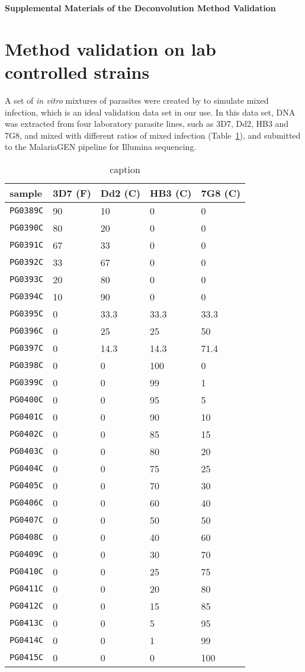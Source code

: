 

\begin{center}
\textbf{\large Supplemental Materials of the Deconvolution Method Validation}
\end{center}

\section{Method validation on lab controlled strains} \label{sup:sec:validate}
A set of {\it in vitro} mixtures of parasites were created by \citet{Wendler2015:sup} to simulate mixed infection, which is an ideal validation data set in our use. In this data set, DNA was extracted from four laboratory parasite lines, such as 3D7, Dd2, HB3 and 7G8, and mixed with different ratios of mixed infection (Table~\ref{tab:jason}), and submitted to the MalariaGEN \citep{MalariaGen2008:sup} pipeline for Illumina sequencing.

\begin{table}[ht]\centering
\begin{tabular}[c]{@{}l|llll@{}}
sample    & 3D7 (F) & Dd2 (C) & HB3 (C) & 7G8 (C)\\ \hline
{\tt PG0389\-C} & 90 & 10 & 0 & 0\tabularnewline
{\tt PG0390\-C} & 80 & 20 & 0 & 0\tabularnewline
{\tt PG0391\-C} & 67 & 33 & 0 & 0\tabularnewline
{\tt PG0392\-C} & 33 & 67 & 0 & 0\tabularnewline
{\tt PG0393\-C} & 20 & 80 & 0 & 0\tabularnewline
{\tt PG0394\-C} & 10 & 90 & 0 & 0\tabularnewline
{\tt PG0395\-C} & 0 & 33.3 & 33.3 & 33.3\tabularnewline
{\tt PG0396\-C} & 0 & 25 & 25 & 50\tabularnewline
{\tt PG0397\-C} & 0 & 14.3 & 14.3 & 71.4\tabularnewline
{\tt PG0398\-C} & 0 & 0 & 100 & 0\tabularnewline
{\tt PG0399\-C} & 0 & 0 & 99 & 1\tabularnewline
{\tt PG0400\-C} & 0 & 0 & 95 & 5\tabularnewline
{\tt PG0401\-C} & 0 & 0 & 90 & 10\tabularnewline
{\tt PG0402\-C} & 0 & 0 & 85 & 15\tabularnewline
{\tt PG0403\-C} & 0 & 0 & 80 & 20\tabularnewline
{\tt PG0404\-C} & 0 & 0 & 75 & 25\tabularnewline
{\tt PG0405\-C} & 0 & 0 & 70 & 30\tabularnewline
{\tt PG0406\-C} & 0 & 0 & 60 & 40\tabularnewline
{\tt PG0407\-C} & 0 & 0 & 50 & 50\tabularnewline
{\tt PG0408\-C} & 0 & 0 & 40 & 60\tabularnewline
{\tt PG0409\-C} & 0 & 0 & 30 & 70\tabularnewline
{\tt PG0410\-C} & 0 & 0 & 25 & 75\tabularnewline
{\tt PG0411\-C} & 0 & 0 & 20 & 80\tabularnewline
{\tt PG0412\-C} & 0 & 0 & 15 & 85\tabularnewline
{\tt PG0413\-C} & 0 & 0 & 5 & 95\tabularnewline
{\tt PG0414\-C} & 0 & 0 & 1 & 99\tabularnewline
{\tt PG0415\-C} & 0 & 0 & 0 & 100\tabularnewline
\end{tabular}
\caption{\color{red}caption}
\label{tab:jason}
\end{table}

